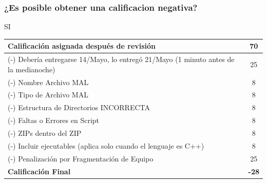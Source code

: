 \begin{frame}
\frametitle{¿Es posible obtener una calificacion negativa?}
SI
\begin{center}
\begin{tabular}{p{12cm}|c}
\hline
Calificación asignada después de revisión & 70 \\ \hline
(-) Debería entregarse 14/Mayo, lo entregó 21/Mayo (1 minuto antes de la medianoche) & 25 \\
(-) Nombre Archivo MAL & 8 \\ 
(-) Tipo de Archivo MAL & 8 \\ 
(-) Estructura de Directorios INCORRECTA & 8 \\ 
(-) Faltas o Errores en Script  & 8 \\ 
(-) ZIPs dentro del ZIP  & 8 \\ 
(-) Incluir ejecutables (aplica solo cuando el lenguaje es C++)  & 8 \\ \hline
(-) Penalización por Fragmentación de Equipo  & 25 \\ \hline
\textbf{Calificación Final}  & \textbf{-28} \\ \hline
\hline
\hline
\end{tabular}


\end{center}


\end{frame}




